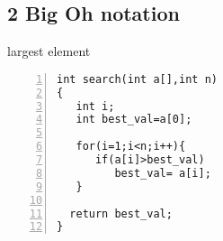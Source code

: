 \documentclass{beamer}
\begin{document}
\subsection*{2 Big Oh notation}


\begin{frame}[fragile]{largest element}
\begin{lstlisting}[numbers=left]
int search(int a[],int n)
{
   int i;
   int best_val=a[0];

   for(i=1;i<n;i++){
      if(a[i]>best_val)
         best_val= a[i];
   }

  return best_val;
}
\end{lstlisting}
\end{frame}
\end{document}
